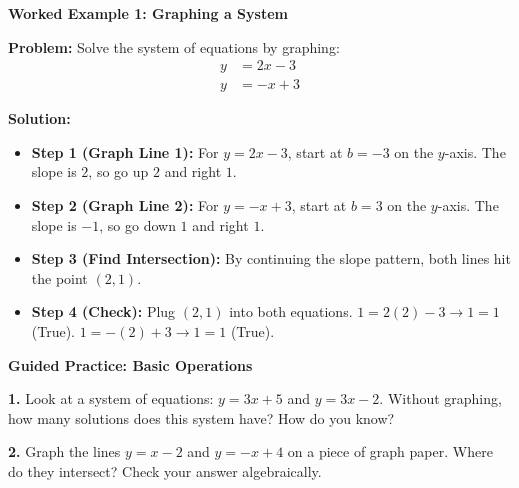 \documentclass[12pt, letterpaper, fleqn]{article}
\begin{document}
\vspace{3mm}

\begin{tcolorbox}[colback=white, colframe=black!25, boxrule=0.6pt, arc=4mm, left=6mm, right=6mm, top=5mm, bottom=5mm]

\textbf{Worked Example 1: Graphing a System}

\medskip

\textbf{Problem:} Solve the system of equations by graphing:
\begin{align*}
    y &= 2x - 3 \\
    y &= -x + 3
\end{align*}

\medskip

\textbf{Solution:}
\begin{itemize}
    \item \textbf{Step 1 (Graph Line 1):} For $y = 2x - 3$, start at $b = -3$ on the $y$-axis. The slope is $2$, so go up $2$ and right $1$.
    \item \textbf{Step 2 (Graph Line 2):} For $y = -x + 3$, start at $b = 3$ on the $y$-axis. The slope is $-1$, so go down $1$ and right $1$.
    \item \textbf{Step 3 (Find Intersection):} By continuing the slope pattern, both lines hit the point $(2, 1)$.
    \item \textbf{Step 4 (Check):} Plug $(2,1)$ into both equations. 
    $1 = 2(2) - 3 \rightarrow 1 = 1$ (True). 
    $1 = -(2) + 3 \rightarrow 1 = 1$ (True).
\end{itemize}

\end{tcolorbox}

\vspace{4mm}

\begin{tcolorbox}[colback=white!15, colframe=black, boxrule=1.5pt, arc=4mm, left=6mm, right=6mm, top=5mm, bottom=5mm]

\textbf{Guided Practice: Basic Operations}

\medskip

\noindent
\textbf{1.} Look at a system of equations: $y = 3x + 5$ and $y = 3x - 2$. Without graphing, how many solutions does this system have? How do you know?
\vspace{1.5cm}

\noindent
\textbf{2.} Graph the lines $y = x - 2$ and $y = -x + 4$ on a piece of graph paper. Where do they intersect? Check your answer algebraically.
\vspace{2.5cm}

\end{tcolorbox}
\end{document}
